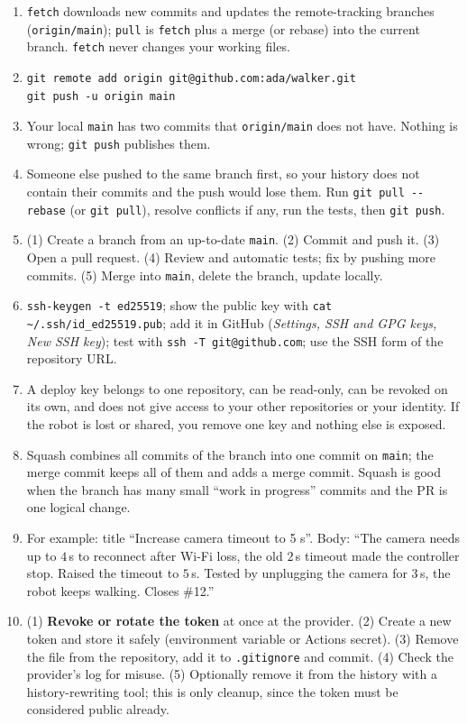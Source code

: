 \begin{enumerate}[label=\textbf{\ansnum.\arabic*}]
  \item \texttt{fetch} downloads new commits and updates the remote-tracking branches (\texttt{origin/main}); \texttt{pull} is \texttt{fetch} plus a merge (or rebase) into the current branch. \texttt{fetch} never changes your working files.
  \item
\begin{verbatim}
git remote add origin git@github.com:ada/walker.git
git push -u origin main
\end{verbatim}
  \item Your local \texttt{main} has two commits that \texttt{origin/main} does not have. Nothing is wrong; \verb!git push! publishes them.
  \item Someone else pushed to the same branch first, so your history does not contain their commits and the push would lose them. Run \verb!git pull --rebase! (or \texttt{git pull}), resolve conflicts if any, run the tests, then \verb!git push!.
  \item (1) Create a branch from an up-to-date \texttt{main}. (2) Commit and push it. (3) Open a pull request. (4) Review and automatic tests; fix by pushing more commits. (5) Merge into \texttt{main}, delete the branch, update locally.
  \item \verb!ssh-keygen -t ed25519!; show the public key with \verb!cat ~/.ssh/id_ed25519.pub!; add it in GitHub (\emph{Settings, SSH and GPG keys, New SSH key}); test with \verb!ssh -T git@github.com!; use the SSH form of the repository URL.
  \item A deploy key belongs to one repository, can be read-only, can be revoked on its own, and does not give access to your other repositories or your identity. If the robot is lost or shared, you remove one key and nothing else is exposed.
  \item Squash combines all commits of the branch into one commit on \texttt{main}; the merge commit keeps all of them and adds a merge commit. Squash is good when the branch has many small ``work in progress'' commits and the PR is one logical change.
  \item For example: title ``Increase camera timeout to 5 s''. Body: ``The camera needs up to $4$\,s to reconnect after Wi-Fi loss, the old $2$\,s timeout made the controller stop. Raised the timeout to $5$\,s. Tested by unplugging the camera for $3$\,s, the robot keeps walking. Closes \#12.''
  \item[\textbf{\ansnum.10}] (1) \textbf{Revoke or rotate the token} at once at the provider. (2) Create a new token and store it safely (environment variable or Actions secret). (3) Remove the file from the repository, add it to \texttt{.gitignore} and commit. (4) Check the provider's log for misuse. (5) Optionally remove it from the history with a history-rewriting tool; this is only cleanup, since the token must be considered public already.
\end{enumerate}
